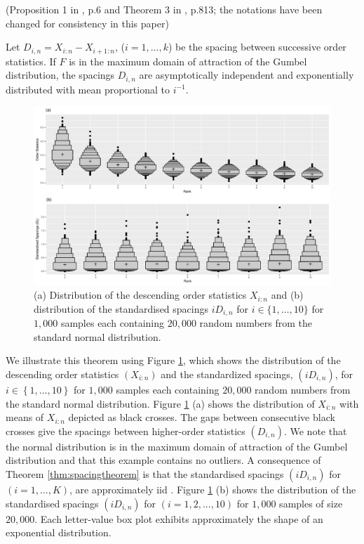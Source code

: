 \documentclass[11pt,a4paper,]{article}
\theoremstyle{definition}
\theoremstyle{definition}
\theoremstyle{definition}
\theoremstyle{remark}
\let\BeginKnitrBlock\begin \let\EndKnitrBlock\end
\begin{document}
\BeginKnitrBlock{theorem}[Spacing Theorem]
\protect\hypertarget{thm:spacingtheorem}{}{\label{thm:spacingtheorem} {} }(Proposition 1 in \textcite{burridge2006additive}, p.6 and Theorem 3 in \textcite{weissman1978estimation}, p.813; the notations have been changed for consistency in this paper)

Let \(D_{i,n} = X_{i:n} - X_{i+1:n}\), (\(i=1,\dots,k\)) be the spacing between successive order statistics. If \(F\) is in the maximum domain of attraction of the Gumbel distribution, the spacings \(D_{i,n}\) are asymptotically independent and exponentially distributed with mean proportional to \(i^{-1}\).
\EndKnitrBlock{theorem}

\begin{figure}[h]

{\centering \includegraphics[width=1\linewidth]{figure/spacings-1} 

}

\caption{(a) Distribution of the descending order statistics $X_{i:n}$ and (b) distribution of the standardised spacings $iD_{i,n}$ for $i \in \{1,\dots,10\}$ for $1,000$ samples each containing $20,000$ random numbers from the standard normal distribution.}\label{fig:spacings}
\end{figure}

We illustrate this theorem using Figure \ref{fig:spacings}, which shows the distribution of the descending order statistics \((X_{i:n})\) and the standardized spacings, \((iD_{i,n})\), for \(i \in \left\{1,\dots,10\right\}\) for \(1,000\) samples each containing \(20,000\) random numbers from the standard normal distribution. Figure \ref{fig:spacings} (a) shows the distribution of \(X_{i:n}\) with means of \(X_{i:n}\) depicted as black crosses. The gaps between consecutive black crosses give the spacings between higher-order statistics \((D_{i,n})\). We note that the normal distribution is in the maximum domain of attraction of the Gumbel distribution and that this example contains no outliers. A consequence of Theorem \ref{thm:spacingtheorem} is that the standardised spacings \((iD_{i,n})\) for \((i = 1,\dots , K)\), are approximately iid \autocite{burridge2006additive}. Figure \ref{fig:spacings} (b) shows the distribution of the standardised spacings \((iD_{i,n})\) for \((i = 1,2,...,10)\) for \(1,000\) samples of size \(20,000\). Each letter-value box plot \autocite{hofmann2017value} exhibits approximately the shape of an exponential distribution.
\end{document}
